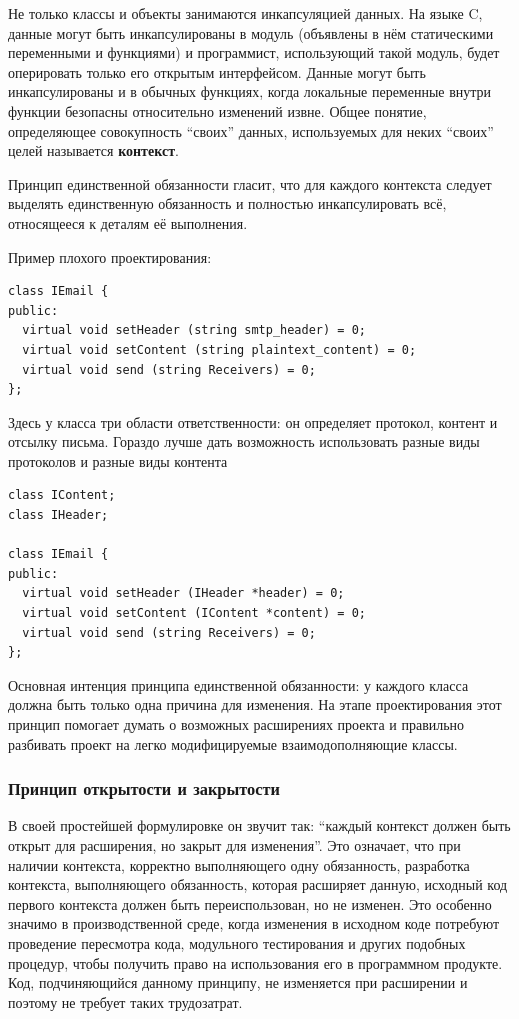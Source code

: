 \documentclass[a4paper,12pt,oneside]{article}
\begin{document}
Не только классы и объекты занимаются инкапсуляцией данных. На языке C, данные могут быть инкапсулированы в модуль (объявлены в нём статическими переменными и функциями) и программист, использующий такой модуль, будет оперировать только его открытым интерфейсом. Данные могут быть инкапсулированы и в обычных функциях, когда локальные переменные внутри функции безопасны относительно изменений извне. Общее понятие, определяющее совокупность ``своих'' данных, используемых для неких ``своих'' целей называется \textbf{контекст}.

Принцип единственной обязанности гласит, что для каждого контекста следует выделять единственную обязанность и полностью инкапсулировать всё, относящееся к деталям её выполнения.

Пример плохого проектирования:

\begin{lstlisting}
class IEmail {
public:
  virtual void setHeader (string smtp_header) = 0;
  virtual void setContent (string plaintext_content) = 0;
  virtual void send (string Receivers) = 0;
};
\end{lstlisting}

Здесь у класса три области ответственности: он определяет протокол, контент и отсылку письма. Гораздо лучше дать возможность использовать разные виды протоколов и разные виды контента

\begin{lstlisting}
class IContent;
class IHeader;

class IEmail {
public:
  virtual void setHeader (IHeader *header) = 0;
  virtual void setContent (IContent *content) = 0;
  virtual void send (string Receivers) = 0;
};
\end{lstlisting}

Основная интенция принципа единственной обязанности: у каждого класса должна быть только одна причина для изменения. На этапе проектирования этот принцип помогает думать о возможных расширениях проекта и правильно разбивать проект на легко модифицируемые взаимодополняющие классы.

\subsubsection{Принцип открытости и закрытости}\label{OCP}

В своей простейшей формулировке он звучит так: ``каждый контекст должен быть открыт для расширения, но закрыт для изменения''. Это означает, что при наличии контекста, корректно выполняющего одну обязанность, разработка контекста, выполняющего обязанность, которая расширяет данную, исходный код первого контекста должен быть переиспользован, но не изменен. Это особенно значимо в производственной среде, когда изменения в исходном коде потребуют проведение пересмотра кода, модульного тестирования и других подобных процедур, чтобы получить право на использования его в программном продукте. Код, подчиняющийся данному принципу, не изменяется при расширении и поэтому не требует таких трудозатрат.
\end{document}
